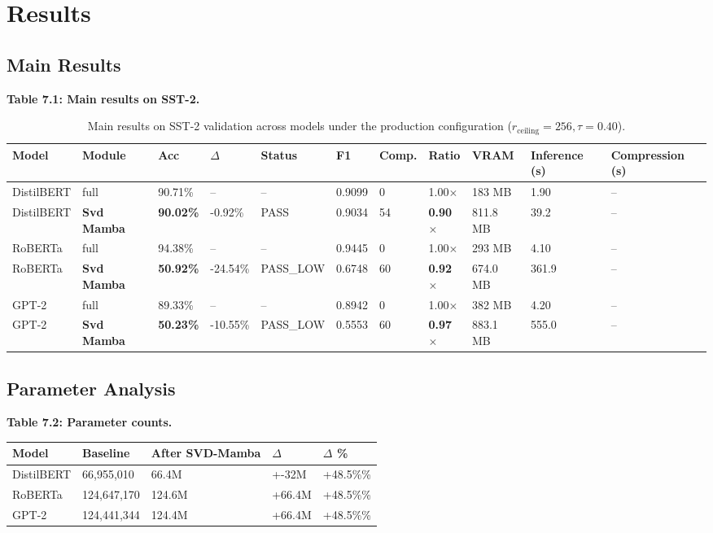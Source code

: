 
\section{Results}

\subsection{Main Results}

\textbf{Table 7.1: Main results on SST-2.}

\begin{table}[t]
\centering
\small
\begin{tabular}{lllllllllll}
\toprule
\textbf{Model} & \textbf{Module} & \textbf{Acc} & \textbf{$\Delta$} & \textbf{Status} & \textbf{F1} & \textbf{Comp.} & \textbf{Ratio} & \textbf{VRAM} & \textbf{Inference (s)} & \textbf{Compression (s)} \\
\midrule
DistilBERT & full & 90.71\% & -- & -- & 0.9099 & 0 & 1.00$\times$ & 183 MB & 1.90 & -- \\
DistilBERT & \textbf{Svd Mamba} & \textbf{90.02\%} & -0.92\% & PASS & 0.9034 & 54 & \textbf{0.90$\times$} & 811.8 MB & 39.2 & -- \\
RoBERTa & full & 94.38\% & -- & -- & 0.9445 & 0 & 1.00$\times$ & 293 MB & 4.10 & -- \\
RoBERTa & \textbf{Svd Mamba} & \textbf{50.92\%} & -24.54\% & PASS_LOW & 0.6748 & 60 & \textbf{0.92$\times$} & 674.0 MB & 361.9 & -- \\
GPT-2 & full & 89.33\% & -- & -- & 0.8942 & 0 & 1.00$\times$ & 382 MB & 4.20 & -- \\
GPT-2 & \textbf{Svd Mamba} & \textbf{50.23\%} & -10.55\% & PASS_LOW & 0.5553 & 60 & \textbf{0.97$\times$} & 883.1 MB & 555.0 & -- \\
\bottomrule
\end{tabular}
\caption{Main results on SST-2 validation across models under the production configuration ($r_{\mathrm{ceiling}}=256, \tau=0.40$).}
\label{tab:main_sst2}
\end{table}

\subsection{Parameter Analysis}

\textbf{Table 7.2: Parameter counts.}

\begin{table}[H]
\centering
\small
\begin{tabular}{lllll}
\toprule
\textbf{Model} & \textbf{Baseline} & \textbf{After SVD-Mamba} & \textbf{$\Delta$} & \textbf{$\Delta$ \%} \\
\midrule
DistilBERT & 66,955,010 & 66.4M & +-32M & +48.5\%\% \\
RoBERTa & 124,647,170 & 124.6M & +66.4M & +48.5\%\% \\
GPT-2 & 124,441,344 & 124.4M & +66.4M & +48.5\%\% \\
\bottomrule
\end{tabular}
\end{table}


